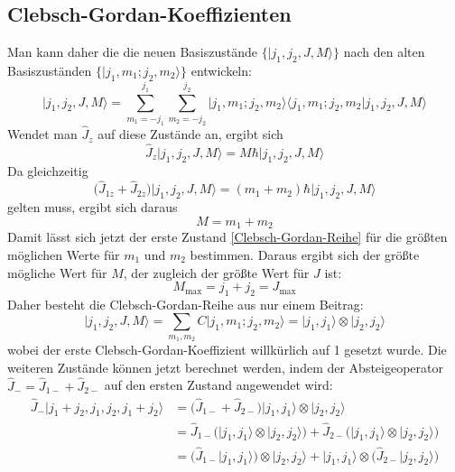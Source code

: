 \documentclass[9pt]{report}
\begin{document}
\subsection{Clebsch-Gordan-Koeffizienten}
Man kann daher die die neuen Basiszustände $\{\big|j_1,j_2,J,M\big\rangle\}$ nach den alten Basiszuständen $\{\big|j_1,m_1;j_2,m_2\big\rangle\}$ entwickeln:
\begin{equation}
\big|j_1,j_2,J,M\big\rangle = \sum_{m_1=-j_1}^{j_1}\sum_{m_2=-j_2}^{j_2}\big|j_1,m_1;j_2,m_2\big\rangle\big\langle j_1,m_1;j_2,m_2\big|j_1,j_2,J,M\big\rangle\label{Clebsch-Gordan-Reihe}
\end{equation}
Wendet man $\hat{J}_{z}$ auf diese Zustände an, ergibt sich
\begin{equation}
\hat{J}_{z}\big|j_1,j_2,J,M\big\rangle = M\hbar\big|j_1,j_2,J,M\big\rangle
\end{equation}
Da gleichzeitig
\begin{equation}
\big(\hat{J}_{1z}+\hat{J}_{2z}\big)\big|j_1,j_2,J,M\big\rangle = (m_1+m_2)\hbar\big|j_1,j_2,J,M\big\rangle
\end{equation}
gelten muss, ergibt sich daraus
\begin{equation}
M = m_1+m_2
\end{equation}
Damit lässt sich jetzt der erste Zustand \eqref{Clebsch-Gordan-Reihe} für die größten möglichen Werte für $m_1$ und $m_2$ bestimmen. Daraus ergibt sich der größte mögliche Wert für $M$, der zugleich der größte Wert für $J$ ist:
\begin{equation}
M_{\mathrm{max}}=j_1+j_2 = J_{\mathrm{max}}
\end{equation}
Daher besteht die Clebsch-Gordan-Reihe aus nur einem Beitrag:
\begin{equation}
\big|j_1,j_2,J,M\big\rangle = \sum_{m_1,m_2}C\big|j_1,m_1;j_2,m_2\big\rangle =\big|j_1,j_1\big\rangle\otimes\big|j_2,j_2\big\rangle
\end{equation}
wobei der erste Clebsch-Gordan-Koeffizient willkürlich auf 1 gesetzt wurde. Die weiteren Zustände können jetzt berechnet werden, indem der Absteigeoperator $\hat{J}_{-}=\hat{J}_{1-}+\hat{J}_{2-}$ auf den ersten Zustand angewendet wird:
\begin{align}
\hat{J}_{-}\big|j_1+j_2,j_1,j_2,j_1+j_2\big\rangle &= \big(\hat{J}_{1-}+\hat{J}_{2-}\big)\big|j_1,j_1\big\rangle\otimes\big|j_2,j_2\big\rangle\\
&=\hat{J}_{1-}\big(\big|j_1,j_1\big\rangle\otimes\big|j_2,j_2\big\rangle\big)+\hat{J}_{2-}\big(\big|j_1,j_1\big\rangle\otimes\big|j_2,j_2\big\rangle\big)\\
&=\big(\hat{J}_{1-}\big|j_1,j_1\big\rangle\big)\otimes\big|j_2,j_2\big\rangle+\big|j_1,j_1\big\rangle\otimes\big(\hat{J}_{2-}\big|j_2,j_2\big\rangle\big)
\end{align}
\end{document}
